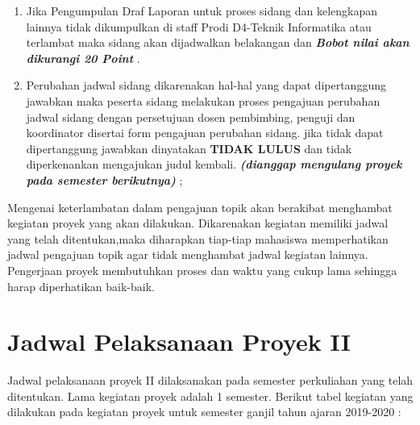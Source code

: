 \begin{enumerate}
	\item Jika Pengumpulan Draf Laporan untuk proses sidang dan kelengkapan	lainnya tidak dikumpulkan di staff Prodi D4-Teknik Informatika	atau terlambat maka	sidang akan	dijadwalkan	belakangan	dan \textit{\textbf{Bobot	nilai	akan dikurangi	20	Point}}	.	
	
	\item Perubahan	 jadwal	 sidang	 dikarenakan	 hal-hal	 yang	 dapat	 dipertanggung	 jawabkan maka	 peserta	 sidang	 melakukan	 proses	 pengajuan	 perubahan	 jadwal	 sidang	 dengan	persetujuan	 dosen	pembimbing,	penguji	 dan	 koordinator	 disertai	 form pengajuan	
perubahan	sidang. jika tidak dapat dipertanggung	jawabkan	dinyatakan \textbf{TIDAK	LULUS}  dan tidak diperkenankan mengajukan judul kembali. \textit{\textbf{(dianggap mengulang proyek pada semester berikutnya)}} ;
	
\end{enumerate}

\par Mengenai keterlambatan	 dalam	 pengajuan	 topik	 akan berakibat menghambat kegiatan proyek yang	akan dilakukan.	Dikarenakan	kegiatan	memiliki jadwal	yang telah ditentukan,maka diharapkan tiap-tiap mahasiswa memperhatikan jadwal pengajuan topik agar tidak menghambat jadwal kegiatan	lainnya. Pengerjaan	proyek	membutuhkan	proses dan	waktu yang	cukup	lama sehingga harap	diperhatikan baik-baik.

\section{Jadwal Pelaksanaan Proyek II}
Jadwal	 pelaksanaan proyek	 II	 dilaksanakan	 pada	 semester	 perkuliahan yang telah	ditentukan.	 Lama	 kegiatan	 proyek	 adalah	 1 semester. Berikut tabel	 kegiatan yang	dilakukan	pada	kegiatan	proyek	untuk	semester	ganjil	tahun	ajaran	2019-2020 :



